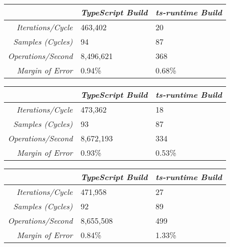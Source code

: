 \begin{center}
{
\centering
\tabulinesep=1.2mm
\setlength{\tabcolsep}{5mm}
\def\arraystretch{1.25}
\small
\begin{tabu} to \textwidth {|r||X[c,m]|X[c,m]|}
  \hline
  & \emph{TypeScript Build} & \emph{ts-runtime Build} \\
  \hline
  \hline
  \emph{Iterations/Cycle}  & 463,402 & 20 \\
  \hline
  \emph{Samples (Cycles)}  & 94 & 87 \\
  \hline
  \emph{Operations/Second} & 8,496,621 & 368 \\
  \hline
  \emph{Margin of Error}   & 0.94\% & 0.68\% \\
  \hline
\end{tabu}
}
\end{center}

\begin{center}
{
\centering
\tabulinesep=1.2mm
\setlength{\tabcolsep}{5mm}
\def\arraystretch{1.25}
\small
\begin{tabu} to \textwidth {|r||X[c,m]|X[c,m]|}
  \hline
  & \emph{TypeScript Build} & \emph{ts-runtime Build} \\
  \hline
  \hline
  \emph{Iterations/Cycle}  & 473,362 & 18 \\
  \hline
  \emph{Samples (Cycles)}  & 93 & 87 \\
  \hline
  \emph{Operations/Second} & 8,672,193 & 334 \\
  \hline
  \emph{Margin of Error}   & 0.93\% & 0.53\% \\
  \hline
\end{tabu}
}
\end{center}

\begin{center}
{
\centering
\tabulinesep=1.2mm
\setlength{\tabcolsep}{5mm}
\def\arraystretch{1.25}
\small
\begin{tabu} to \textwidth {|r||X[c,m]|X[c,m]|}
  \hline
  & \emph{TypeScript Build} & \emph{ts-runtime Build} \\
  \hline
  \hline
  \emph{Iterations/Cycle}  & 471,958 & 27 \\
  \hline
  \emph{Samples (Cycles)}  & 92 & 89 \\
  \hline
  \emph{Operations/Second} & 8,655,508 & 499 \\
  \hline
  \emph{Margin of Error}   & 0.84\% & 1.33\% \\
  \hline
\end{tabu}
}
\end{center}

